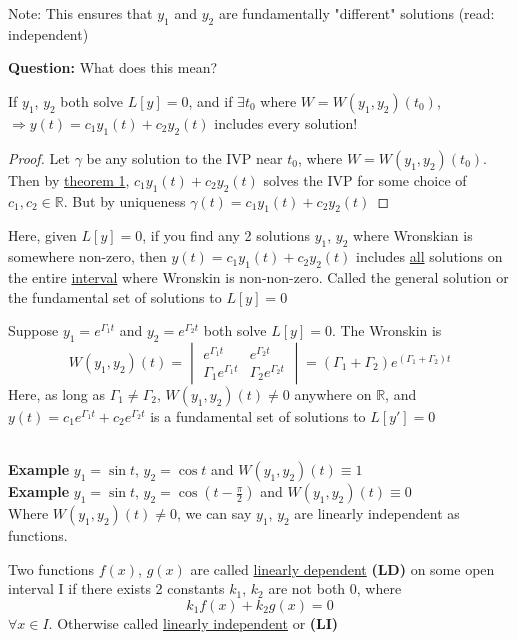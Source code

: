Note: This ensures that $y_1$ and $y_2$ are fundamentally "different" solutions (read: independent)
\begin{center}
	\textbf{Question:} What does this mean?
\end{center}
\begin{theorem-N}
	If $y_1$, $y_2$ both solve $L[y] = 0$, and if $\exists t_0$ where $W = W(y_1, y_2)(t_0)$, $\Rightarrow y(t) = c_1 y_1(t) + c_2 y_2(t)$ includes every solution!
\end{theorem-N}
\begin{proof}
	Let $\gamma$ be any solution to the IVP near $t_0$, where $W = W(y_1, y_2)(t_0)$. Then by \underline{theorem 1}, $c_1 y_1(t) + c_2 y_2(t)$ solves the IVP for some choice of $c_1, c_2 \in \mathbb{R}$. But by uniqueness $\gamma (t) = c_1 y_1(t) + c_2 y_2(t)$
\end{proof}
Here, given $L[y] = 0$, if you find any 2 solutions $y_1$, $y_2$ where Wronskian is somewhere non-zero, then $y(t) = c_1 y_1(t) + c_2 y_2(t)$ includes \underline{all} solutions on the entire \underline{interval} where Wronskin is non-non-zero. Called the general solution or the fundamental set of solutions to $L[y] = 0$\\
\begin{example-N}
	Suppose $y_1 = e^{\Gamma_1 t}$ and $y_2 = e^{\Gamma_2 t}$ both solve $L[y] = 0$. The Wronskin is
	\begin{equation*}
		W(y_1, y_2)(t) = 
		\begin{vmatrix}
			e^{\Gamma_1 t} & e^{\Gamma_2 t}\\
			\Gamma_1 e^{\Gamma_1 t} & \Gamma_2 e^{\Gamma_2 t}
		\end{vmatrix}
		 = (\Gamma_1 + \Gamma_2) e^{(\Gamma_1 + \Gamma_2)t}
	\end{equation*}
	Here, as long as $\Gamma_1 \neq \Gamma_2$, $W(y_1, y_2)(t) \neq 0$ anywhere on $\mathbb{R}$, and $y(t) = c_1 e^{\Gamma_1 t} + c_2 e^{\Gamma_2 t}$ is a fundamental set of solutions to $L[y'] = 0$
\end{example-N}
\redhline\\
\textbf{Example} $y_1 = \sin t$, $y_2 = \cos t$ and $W(y_1, y_2)(t) \equiv 1$\\
\textbf{Example} $y_1 = \sin t$, $y_2 = \cos (t - \frac{\pi}{2})$ and $W(y_1, y_2)(t) \equiv 0$\\
Where $W(y_1, y_2)(t) \neq 0$, we can say $y_1$, $y_2$ are linearly independent as functions.\\
\begin{definition}
	Two functions $f(x)$, $g(x)$ are called \underline{linearly dependent} \textbf{(LD)} on some open interval I if there exists 2 constants $k_1$, $k_2$ are not both 0, where
	\begin{equation*}
		k_1 f(x) + k_2 g(x) = 0
	\end{equation*}
	$\forall x \in I$. Otherwise called \underline{linearly independent} or \textbf{(LI)}
\end{definition}
